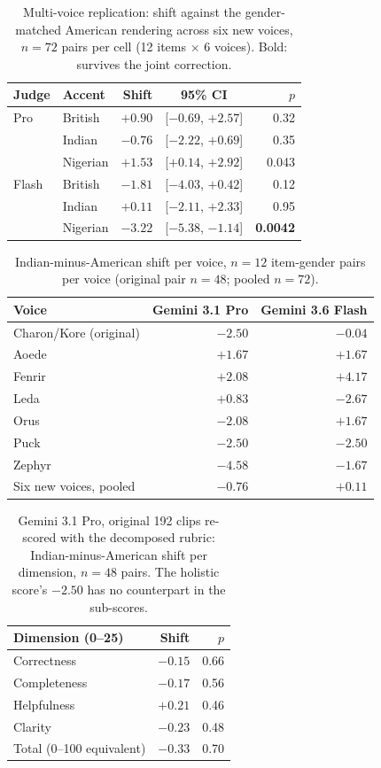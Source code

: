 \begin{table}[t]
\small
\centering
\setlength{\tabcolsep}{4pt}
\begin{tabular}{llrcr}
\toprule
Judge & Accent & Shift & 95\% CI & $p$ \\
\midrule
Pro & British & $+0.90$ & [$-0.69$, $+2.57$] & 0.32 \\
 & Indian & $-0.76$ & [$-2.22$, $+0.69$] & 0.35 \\
 & Nigerian & $+1.53$ & [$+0.14$, $+2.92$] & 0.043 \\
\midrule
Flash & British & $-1.81$ & [$-4.03$, $+0.42$] & 0.12 \\
 & Indian & $+0.11$ & [$-2.11$, $+2.33$] & 0.95 \\
 & Nigerian & $\mathbf{-3.22}$ & [$-5.38$, $-1.14$] & \textbf{0.0042} \\
\bottomrule
\end{tabular}
\caption{Multi-voice replication: shift against the gender-matched American rendering across six new voices, $n=72$ pairs per cell (12 items $\times$ 6 voices). Bold: survives the joint correction.}
\label{tab:multivoice}
\end{table}

\begin{table}[t]
\small
\centering
\begin{tabular}{lrr}
\toprule
Voice & Gemini 3.1 Pro & Gemini 3.6 Flash \\
\midrule
Charon/Kore (original) & $-2.50$ & $-0.04$ \\
Aoede & $+1.67$ & $+1.67$ \\
Fenrir & $+2.08$ & $+4.17$ \\
Leda & $+0.83$ & $-2.67$ \\
Orus & $-2.08$ & $+1.67$ \\
Puck & $-2.50$ & $-2.50$ \\
Zephyr & $-4.58$ & $-1.67$ \\
\midrule
Six new voices, pooled & $-0.76$ & $+0.11$ \\
\bottomrule
\end{tabular}
\caption{Indian-minus-American shift per voice, $n=12$ item-gender pairs per voice (original pair $n=48$; pooled $n=72$).}
\label{tab:pervoice}
\end{table}

\begin{table}[t]
\small
\centering
\begin{tabular}{lrr}
\toprule
Dimension (0--25) & Shift & $p$ \\
\midrule
Correctness & $-0.15$ & 0.66 \\
Completeness & $-0.17$ & 0.56 \\
Helpfulness & $+0.21$ & 0.46 \\
Clarity & $-0.23$ & 0.48 \\
Total (0--100 equivalent) & $-0.33$ & 0.70 \\
\bottomrule
\end{tabular}
\caption{Gemini 3.1 Pro, original 192 clips re-scored with the decomposed rubric: Indian-minus-American shift per dimension, $n=48$ pairs. The holistic score's $-2.50$ has no counterpart in the sub-scores.}
\label{tab:dims}
\end{table}

